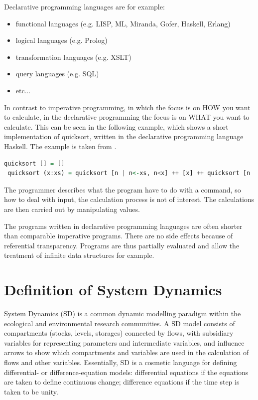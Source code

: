 \par
Declarative programming languages are for example:
\begin{itemize}
	\item functional languages (e.g. LISP, ML, Miranda, Gofer, Haskell, Erlang)
	\item logical languages (e.g. Prolog)
	\item transformation languages (e.g. XSLT)
	\item query languages (e.g. SQL)
	\item etc...
\end{itemize}

\par
In contrast to imperative programming, in which the focus is on HOW you want to calculate, in the declarative programming the focus is on WHAT you want to calculate. This can be seen in the following example, which shows a short implementation of quicksort, written in the declarative programming language Haskell. The example is taken from \autocite{appendix:declarative_programming}.
\begin{lstlisting}[language=Haskell]
 quicksort [] = []
 quicksort (x:xs) = quicksort [n | n<-xs, n<x] ++ [x] ++ quicksort [n | n<-xs, n>=x]
\end{lstlisting}
The programmer describes what the program have to do with a command, so how to deal with input, the calculation process is not of interest. The calculations are then carried out by manipulating values.
\par
The programs written in declarative programming languages are often shorter than comparable imperative programs. There are no side effects because of referential transparency. Programs are thus partially evaluated and allow the treatment of infinite data structures for example. \autocite{appendix:hawkins}

\section{Definition of System Dynamics}
\par
System Dynamics (SD) is a common dynamic modelling paradigm within the ecological and environmental research communities. A SD model consists of compartments (stocks, levels, storages) connected by flows, with subsidiary variables for representing parameters and intermediate variables, and influence arrows to show which compartments and variables are used in the calculation of flows and other variables. Essentially, SD is a cosmetic language for defining differential- or difference-equation models: differential equations if the equations are taken to define continuous change; difference equations if the time step is taken to be unity. \autocite{appendix:model_paradigm}

